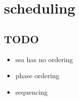 \applynumberofpages\chapter{scheduling }
\section{TODO}


\begin{itemize}
	\item ssa has no ordering
	\item phase ordering
	\item sequencing
\end{itemize}
